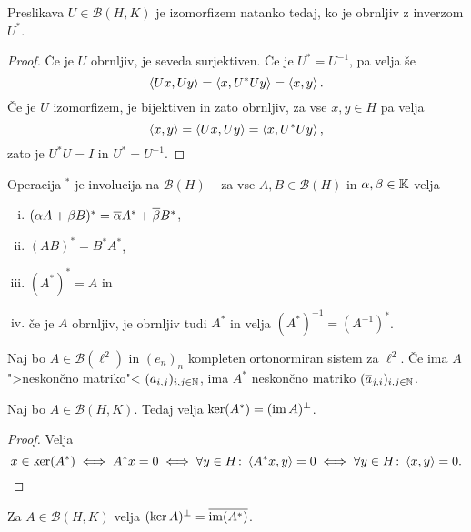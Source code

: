 \begin{trditev}
Preslikava $U \in \mathcal{B}(H,K)$ je izomorfizem natanko tedaj,
ko je obrnljiv z inverzom $U^*$.
\end{trditev}

\begin{proof}
Če je $U$ obrnljiv, je seveda surjektiven. Če je $U^* = U^{-1}$, pa
velja še
\[
\left\langle Ux,Uy\right\rangle = \left\langle x,U^*Uy\right\rangle = \left\langle x,y\right\rangle.
\]
Če je $U$ izomorfizem, je bijektiven in zato obrnljiv, za vse
$x,y \in H$ pa velja
\[
\left\langle x,y\right\rangle = \left\langle Ux,Uy\right\rangle = \left\langle x,U^*Uy\right\rangle,
\]
zato je $U^*U = I$ in $U^* = U^{-1}$.
\end{proof}

\begin{trditev}
Operacija $^*$ je involucija na $\mathcal{B}(H)$ -- za vse
$A, B \in \mathcal{B}(H)$ in $\alpha, \beta \in \mathbb{K}$ velja

\begin{enumerate}[i)]
\item
$(\alpha A + \beta B)^* = \overline{\alpha} A^* + \overline{\beta} B^*$,
\item $(AB)^* = B^* A^*$,
\item $(A^*)^* = A$ in
\item če je $A$ obrnljiv, je obrnljiv tudi $A^*$ in velja
$(A^*)^{-1} = (A^{-1})^*$.
\end{enumerate}
\end{trditev}

\obvs

\begin{zgled}
Naj bo $A \in \mathcal{B}(\ell^2)$ in $(e_n)_n$ kompleten
ortonormiran sistem za $\ell^2$. Če ima $A$ ">neskončno matriko"<
$(a_{i,j})_{i,j \in \mathbb{N}}$, ima $A^*$ neskončno matriko
$(\overline{a}_{j,i})_{i,j \in \mathbb{N}}$.
\end{zgled}

\begin{izrek}\label{iz:ker_im:1}
Naj bo $A \in \mathcal{B}(H,K)$. Tedaj velja
$\ker(A^*) = (\operatorname{im} A)^\bot$.
\end{izrek}

\begin{proof}
Velja
\[
x \in \ker(A^*) \iff A^*x = 0 \iff
\forall y \in H \colon \left\langle A^*x,y\right\rangle = 0 \iff
\forall y \in H \colon \left\langle x,y\right\rangle = 0. \qedhere
\]
\end{proof}

\begin{posledica}
Za $A \in \mathcal{B}(H,K)$ velja
$(\ker A)^\bot = \overline{\operatorname{im}(A^*)}$.
\end{posledica}

